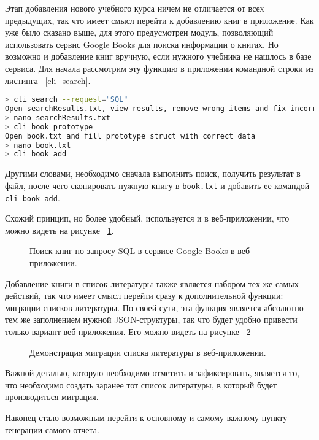 Этап добавления нового учебного курса ничем не отличается от всех предыдущих, так что имеет смысл перейти к добавлению книг в приложение.
Как уже было сказано выше, для этого предусмотрен модуль, позволяющий использовать сервис Google Books для поиска информации о
книгах. Но возможно и добавление книг вручную, если нужного учебника не нашлось в базе сервиса. 
Для начала рассмотрим эту функцию в приложении командной строки из листинга ~\ref{cli_search}.

\begin{lstlisting}[language=bash, caption = {Поиск книг по запросу SQL в сервисе Google Books в приложении командной строки.}, captionpos=b, label={cli_search}]
> cli search --request="SQL"
Open searchResults.txt, view results, remove wrong items and fix incorrect data.
> nano searchResults.txt 
> cli book prototype
Open book.txt and fill prototype struct with correct data
> nano book.txt
> cli book add
\end{lstlisting}

Другими словами, необходимо сначала выполнить поиск, получить результат в файл, после чего скопировать нужную книгу в
\texttt{book.txt} и добавить ее командой \texttt{cli book add}.

Схожий принцип, но более удобный, используется и в веб-приложении, что можно видеть на рисунке ~\ref{web_search}.

\begin{figure}[h!]
	\caption{Поиск книг по запросу SQL в сервисе Google Books в веб-приложении.}
	\label{web_search}
\end{figure}

Добавление книги в список литературы также является набором тех же самых действий, так что имеет смысл перейти сразу к дополнительной функции:
миграции списков литературы. По своей сути, эта функция является абсолютно тем же заполнением нужной JSON-структуры, так что будет
удобно привести только вариант веб-приложения. Его можно видеть на рисунке ~\ref{web_migrate}

\begin{figure}[h!]
	\caption{Демонстрация миграции списка литературы в веб-приложении.}
	\label{web_migrate}
\end{figure}

Важной деталью, которую необходимо отметить и зафиксировать, является то, что необходимо создать заранее тот список литературы, в который
будет производиться миграция.

Наконец стало возможным перейти к основному и самому важному пункту -- генерации самого отчета.